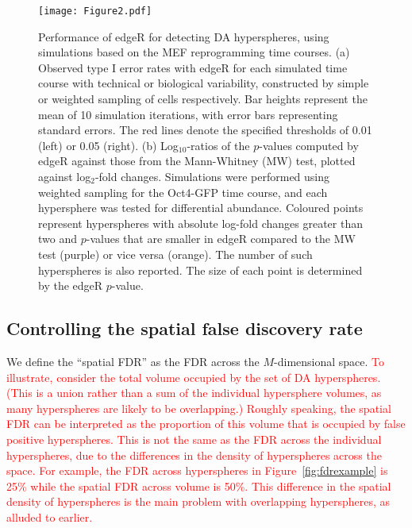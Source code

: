 \documentclass{article}
\newcommand\revised[1]{\textcolor{red}{#1}}
\begin{document}
\begin{figure}[bt]
    \begin{center}
        \texttt{[image: Figure2.pdf]}
    \end{center}
\caption{
Performance of edgeR for detecting DA hyperspheres, using simulations based on the MEF reprogramming time courses.
(a) Observed type I error rates with edgeR for each simulated time course with technical or biological variability, constructed by simple or weighted sampling of cells respectively.
Bar heights represent the mean of 10 simulation iterations, with error bars representing standard errors.
The red lines denote the specified thresholds of 0.01 (left) or 0.05 (right).
(b) Log$_{10}$-ratios of the $p$-values computed by edgeR against those from the Mann-Whitney (MW) test, plotted against log$_{2}$-fold changes.
Simulations were performed using weighted sampling for the Oct4-GFP time course, and each hypersphere was tested for differential abundance.
Coloured points represent hyperspheres with absolute log-fold changes greater than two and $p$-values that are smaller in edgeR compared to the MW test (purple) or vice versa (orange).
The number of such hyperspheres is also reported.
The size of each point is determined by the edgeR $p$-value.
}
\label{fig:testtest}
\end{figure}

\subsection{Controlling the spatial false discovery rate}
We define the ``spatial FDR'' as the FDR across the $M$-dimensional space.
\revised{To illustrate, consider the total volume occupied by the set of DA hyperspheres.
    (This is a union rather than a sum of the individual hypersphere volumes, as many hyperspheres are likely to be overlapping.)
    Roughly speaking, the spatial FDR can be interpreted as the proportion of this volume that is occupied by false positive hyperspheres.
    This is not the same as the FDR across the individual hyperspheres, due to the differences in the density of hyperspheres across the space.
    For example, the FDR across hyperspheres in Figure~\ref{fig:fdrexample} is 25\% while the spatial FDR across volume is 50\%.
    This difference in the spatial density of hyperspheres is the main problem with overlapping hyperspheres, as alluded to earlier.}
\end{document}
